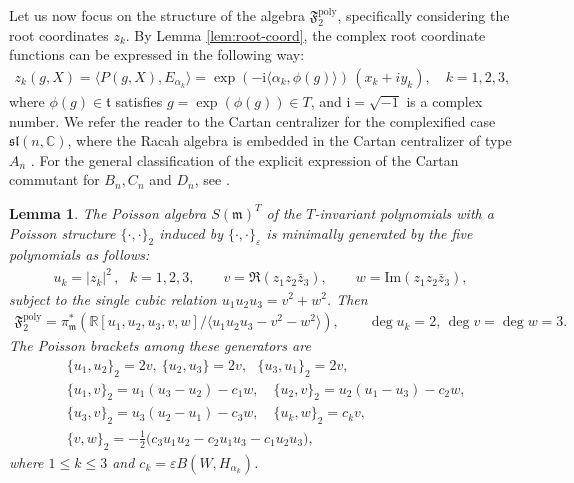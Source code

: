 \documentclass[11pt]{amsart}
\newtheorem{lemma}[theorem]{Lemma}
\theoremstyle{definition}
\theoremstyle{plain}
\theoremstyle{conclusion}
\begin{document}
Let us now focus on the structure of the algebra $\mathfrak{F}_2^{\mathrm{poly}}$, specifically considering the root coordinates $z_k$. By Lemma \ref{lem:root-coord}, the complex root coordinate functions can be expressed in the following way: \begin{align}
    z_k(g,X)= \langle P(g,X),E_{\alpha_k}\rangle    =\exp(-\mathrm{i}\langle\alpha_k,\phi(g)\rangle)\,(x_k+iy_k),\quad k=1,2,3, \label{eq:coordinate}
\end{align}  where $\phi(g)\in\mathfrak{t}$ satisfies $g=\exp(\phi(g)) \in T $, and $\mathrm{i} = \sqrt{-1}$ is a complex number. We refer the reader to \cite{campoamor2023algebraic} the Cartan centralizer for the complexified case $\mathfrak{sl}(n,\mathbb{C})$, where the Racah algebra is embedded in the Cartan centralizer of type $A_n$ \cite{MR3884869}. For the general classification of the explicit expression of the Cartan commutant for $B_n,C_n$ and $D_n$, see \cite{campoamor2024superintegrable,abc}.  %
 \begin{lemma}
 \label{alg1}
The Poisson algebra $S(\mathfrak{m})^T$ of the $T$-invariant polynomials with a Poisson structure $\{\cdot,\cdot\}_2$ induced by $\{\cdot,\cdot\}_\varepsilon$ is minimally generated by the five polynomials as follows:  \begin{align*}
    u_k=|z_k|^2\,, \text{ } k=1,2,3 ,\qquad v=\Re(z_1z_2\bar z_3),\qquad w=\mathrm{Im}(z_1z_2\bar z_3),
\end{align*} subject to the single cubic relation $ u_1u_2u_3=v^2+w^2 $.  Then   \begin{align*}
    \mathfrak{F}_2^{\mathrm{poly}} =  \pi_\mathfrak{m}^* \left(\mathbb{R}[u_1,u_2,u_3,v,w]\Big/ \langle u_1u_2u_3-v^2-w^2\rangle\right), \qquad \deg u_k=2,\,\deg v=\deg w=3.
\end{align*}  The Poisson brackets among these generators are  \begin{align}
 \nonumber
     &\{u_1,u_2\}_2=2v,\ \{u_2,u_3\}=2v,\ \ \ \{u_3,u_1\}_2=2v,\\
     \nonumber
&\{u_1,v\}_2=u_1(u_3-u_2)-c_1w,\quad    \{u_2,v\}_2=u_2(u_1-u_3)-c_2w,\\
&\{u_3,v\}_2=u_3(u_2-u_1)-c_3w,\quad   \{u_k,w\}_2=c_k v,\\
  \nonumber
&\{v,w\}_2=-\frac{1}{2}\big(c_3u_1u_2-c_2u_1u_3-c_1u_2u_3\big),
 \end{align}  where $ 1\leq  k \leq 3$ and $c_k = \varepsilon B(W,H_{\alpha_k})$. %
\end{lemma}
\end{document}
